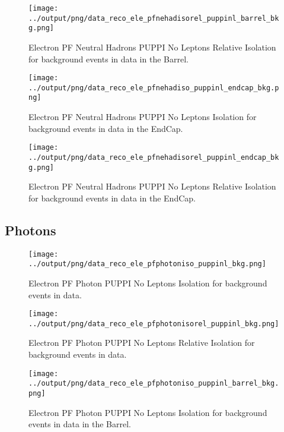 \documentclass[11pt]{book}
\begin{document}
\begin{figure}[htb]
\centering
\texttt{[image: ../output/png/data\_reco\_ele\_pfnehadisorel\_puppinl\_barrel\_bkg.png]}
\caption{Electron PF Neutral Hadrons PUPPI No Leptons Relative Isolation for background events in data in the Barrel.}
\label{fig:data_ele_pfnehadisorel_puppinl_barrel_bkg}
\end{figure}

\begin{figure}[htb]
\centering
\texttt{[image: ../output/png/data\_reco\_ele\_pfnehadiso\_puppinl\_endcap\_bkg.png]}
\caption{Electron PF Neutral Hadrons PUPPI No Leptons Isolation for background events in data in the EndCap.}
\label{fig:data_ele_pfnehadiso_puppinl_endcap_bkg}
\end{figure}

\begin{figure}[htb]
\centering
\texttt{[image: ../output/png/data\_reco\_ele\_pfnehadisorel\_puppinl\_endcap\_bkg.png]}
\caption{Electron PF Neutral Hadrons PUPPI No Leptons Relative Isolation for background events in data in the EndCap.}
\label{fig:data_ele_pfnehadisorel_puppinl_endcap_bkg}
\end{figure}
\clearpage

\subsection{Photons}
\begin{figure}[htb]
\centering
\texttt{[image: ../output/png/data\_reco\_ele\_pfphotoniso\_puppinl\_bkg.png]}
\caption{Electron PF Photon PUPPI No Leptons Isolation for background events in data.}
\label{fig:data_ele_pfphotoniso_puppinl_bkg}
\end{figure}

\begin{figure}[htb]
\centering
\texttt{[image: ../output/png/data\_reco\_ele\_pfphotonisorel\_puppinl\_bkg.png]}
\caption{Electron PF Photon PUPPI No Leptons Relative Isolation for background events in data.}
\label{fig:data_ele_pfphotonisorel_puppinl_bkg}
\end{figure}

\begin{figure}[htb]
\centering
\texttt{[image: ../output/png/data\_reco\_ele\_pfphotoniso\_puppinl\_barrel\_bkg.png]}
\caption{Electron PF Photon PUPPI No Leptons Isolation for background events in data in the Barrel.}
\label{fig:data_ele_pfphotoniso_puppinl_barrel_bkg}
\end{figure}
\end{document}
